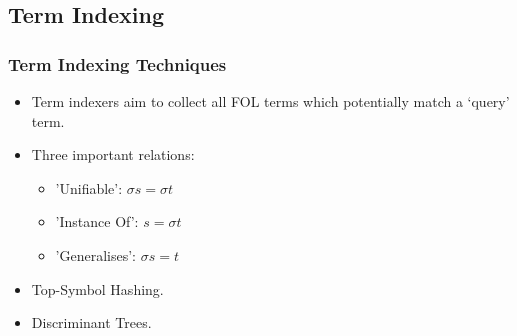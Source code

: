 \documentclass[10pt]{beamer}
\begin{document}
\begin{NoHyper}
\subsection{Term Indexing} 
\begin{frame}
  \frametitle{Term Indexing Techniques}
  \begin{itemize}
  \item<1-> Term indexers aim to collect all FOL terms which potentially match a `query' term.
  \item<1-> Three important relations:
  \begin{itemize}
  \item<2-> 'Unifiable': $\sigma s = \sigma t$
  \item<2-> 'Instance Of': $s = \sigma t$
  \item<2-> 'Generalises': $\sigma s = t$
  \end{itemize}
  \item<3-> Top-Symbol Hashing.
  \item<3-> Discriminant Trees.
  \end{itemize}
\end{frame}


\end{NoHyper}
\end{document}
